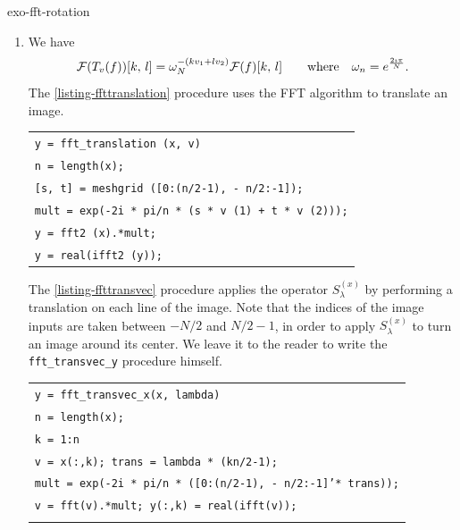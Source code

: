  
\begin{correction}{exo-fft-rotation}
  \begin{enumerate}
\item {} We have
\begin{equation*}
\mathcal{F}(T_v (f)) [k, \, l] = \omega_N^{- (k v_1 + l v_2)} \mathcal{F}(f) [k, \, l] \quad \quad \text{where} \quad \omega_n = e^{\frac{2 \imath \pi}{N}}.
\end{equation*}
The \Matlab{} \ref{listing-ffttranslation} procedure uses the FFT algorithm to translate an image.

\begin{listing} 
\begin{footnotesize}
{\upshape
\begin{tabular}{l} \texttt{\pfunction y = fft\_translation (x, v)} \\
\texttt{n = length(x);} \\
\texttt{[s, t] = meshgrid ([0:(n/2-1), - n/2:-1]);} \\
\texttt{mult = exp(-2i * pi/n * (s * v (1) + t * v (2)));} \\
\texttt{y = fft2 (x).*mult;} \\
\texttt{y = real(ifft2 (y));} \\
\end{tabular}
}
\end{footnotesize}
\caption{Procedure \texttt{\upshape fft\_translation}}
\label{listing-ffttranslation}
\end{listing}

The \ref{listing-ffttransvec} procedure applies the operator $ S_\lambda^{(x)} $ by performing a translation on each line of the image. Note that the indices of the image inputs are taken between $ -N/2 $ and $ N/2-1 $, in order to apply $ S_\lambda^{(x)} $ to turn an image around its center. We leave it to the reader to write the \texttt{fft\_transvec\_y} procedure himself.

\begin{listing} 
\begin{footnotesize} 
{\upshape
\begin{tabular}{l} \texttt{\pfunction y = fft\_transvec\_x(x, lambda)} \\
\texttt{n = length(x);} \\
\texttt{\pfor k = 1:n} \\
\quad \texttt{v = x(:,k); trans = lambda * (kn/2-1);} \\
\quad \texttt{mult = exp(-2i * pi/n * ([0:(n/2-1), - n/2:-1]'* trans));} \\
\quad \texttt{v = fft(v).*mult; y(:,k) = real(ifft(v));} \\
\texttt{\pend} \\
\end{tabular}
}
\end{footnotesize}
\caption{Procedure \texttt{\upshape fft\_transvec\_x}}
\label{listing-ffttransvec}
\end{listing}
 

\end{enumerate}
\end{correction}
